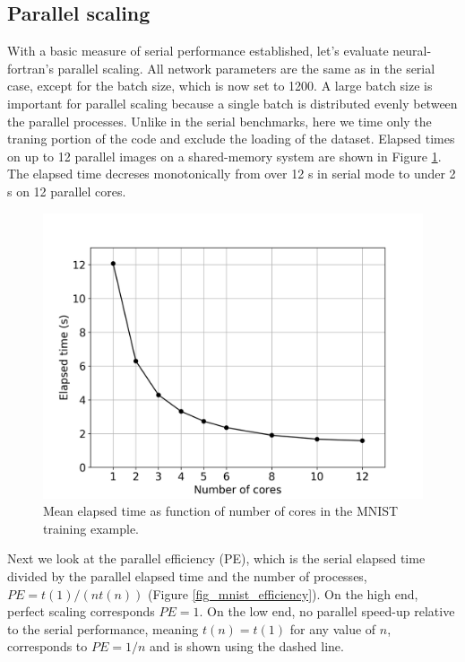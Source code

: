 \documentclass[sigplan, review=false, screen=true, balance=true]{acmart}
\begin{document}
\subsection{Parallel scaling}

With a basic measure of serial performance established, let's evaluate
neural-fortran's parallel scaling. All network parameters are the same as in
the serial case, except for the batch size, which is now set to 1200.
A large batch size is important for parallel scaling because a single batch is
distributed evenly between the parallel processes.
Unlike in the serial benchmarks, here we time only the traning portion
of the code and exclude the loading of the dataset. Elapsed times on up to
12 parallel images on a shared-memory system are shown in Figure
\ref{fig_mnist_elapsed}. The elapsed time decreses monotonically from over
12 s in serial mode to under 2 s on 12 parallel cores.

\begin{figure}[H]
  \centering
  \includegraphics[width=\columnwidth]{../figures/nf-parallel-elapsed.png}
  \caption{Mean elapsed time as function of number of cores in the MNIST training example.}
  \label{fig_mnist_elapsed}
\end{figure}

Next we look at the parallel efficiency (PE), which is the serial elapsed time
divided by the parallel elapsed time and the number of processes,
$PE = t(1) / (n t(n))$ (Figure \ref{fig_mnist_efficiency}).
On the high end, perfect scaling corresponds $PE = 1$.
On the low end, no parallel speed-up relative to the serial performance,
meaning $t(n) = t(1)$ for any value of $n$, corresponds to $PE = 1/n$ and 
is shown using the dashed line.
\end{document}
